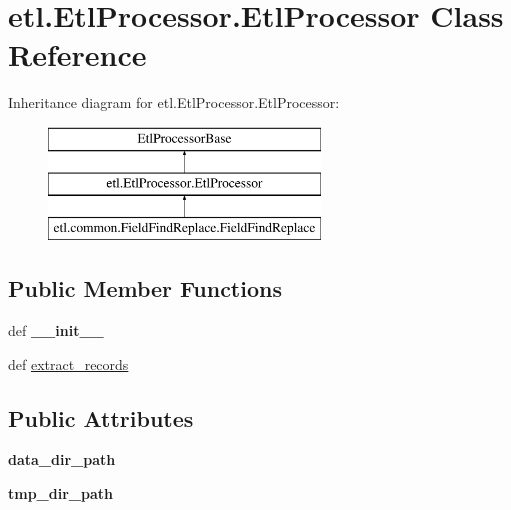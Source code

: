 \hypertarget{classetl_1_1EtlProcessor_1_1EtlProcessor}{\section{etl.\-Etl\-Processor.\-Etl\-Processor Class Reference}
\label{classetl_1_1EtlProcessor_1_1EtlProcessor}
}
Inheritance diagram for etl.\-Etl\-Processor.\-Etl\-Processor\-:\begin{figure}[H]
\begin{center}
\leavevmode
\includegraphics[height=3.000000cm]{classetl_1_1EtlProcessor_1_1EtlProcessor}
\end{center}
\end{figure}
\subsection*{Public Member Functions}
\begin{DoxyCompactItemize}
\item 
\hypertarget{classetl_1_1EtlProcessor_1_1EtlProcessor_a2f31216d32806e4b4495399da7d0c024}{def {\bfseries \-\_\-\-\_\-init\-\_\-\-\_\-}}\label{classetl_1_1EtlProcessor_1_1EtlProcessor_a2f31216d32806e4b4495399da7d0c024}

\item 
def \hyperlink{classetl_1_1EtlProcessor_1_1EtlProcessor_acda16c0d22a7b2d80de6d62133acce0d}{extract\-\_\-records}
\end{DoxyCompactItemize}
\subsection*{Public Attributes}
\begin{DoxyCompactItemize}
\item 
\hypertarget{classetl_1_1EtlProcessor_1_1EtlProcessor_afff0c61d3a059fa201bc0da59a269651}{{\bfseries data\-\_\-dir\-\_\-path}}\label{classetl_1_1EtlProcessor_1_1EtlProcessor_afff0c61d3a059fa201bc0da59a269651}

\item 
\hypertarget{classetl_1_1EtlProcessor_1_1EtlProcessor_aa0175c614fa82691f7177b2e7bd44c4a}{{\bfseries tmp\-\_\-dir\-\_\-path}}\label{classetl_1_1EtlProcessor_1_1EtlProcessor_aa0175c614fa82691f7177b2e7bd44c4a}

\end{DoxyCompactItemize}


